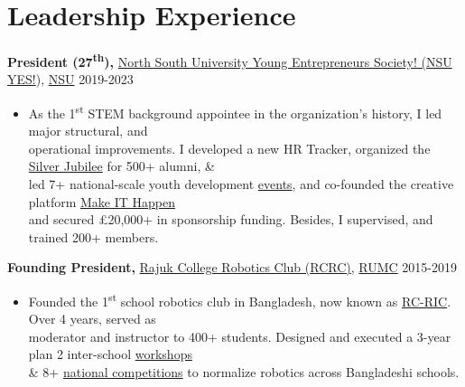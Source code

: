 \documentclass[11pt,a4paper]{article}
\newcommand{\experienceitem}[3]{
  \textbf{#1} {#2} \hfill {\footnotesize{#3}} 
}
\begin{document}
%
%

\section*{Leadership Experience}

  \experienceitem{President (27\textsuperscript{th}),} {\href{https://yes.nsu.edu}{North South University Young Entrepreneurs Society! (NSU YES!}), \href{https://www.northsouth.edu}{NSU}}{2019-2023}
  \begin{itemize}
    \item As the 1\textsuperscript{st} STEM background appointee in the organization’s history, I led major structural, and \\operational improvements. I developed a new HR Tracker, organized the \href{https://www.facebook.com/nsuyes/posts/pfbid0Cz4s9KFdK4cYLLS63xdtPzXVaMHXp2vgtL33HcRQpHZCU4SdPToSLhppy9QP67Ngl}{Silver Jubilee} for 500+ alumni, \& \\led 7+ national-scale youth development \href{https://youtu.be/2ErYexnnDpw}{events}, and co-founded the creative platform \href{https://www.facebook.com/groups/675834216365001}{Make IT Happen} \\ and secured £20,000+ in sponsorship funding. Besides, I supervised, and trained  200+ members.
  \end{itemize}
  \experienceitem{Founding President,} {\href{https://www.facebook.com/events/312626249169334}{Rajuk College Robotics Club (RCRC)}, \href{https://rajukcollege.edu.bd}{RUMC}}{2015-2019}
  \begin{itemize}
    \item Founded the 1\textsuperscript{st} school robotics club in Bangladesh, now known as \href{https://www.facebook.com/rajuk.ric}{RC-RIC}. Over 4 years, served as \\moderator and instructor to 400+ students. Designed and executed a 3-year plan 2 inter-school \href{https://www.facebook.com/events/312626249169334}{workshops} \\ \& 8+ \href{https://youtu.be/7elBWGB8Poc}{national competitions} to normalize robotics across Bangladeshi schools.
  \end{itemize}

\end{document}
